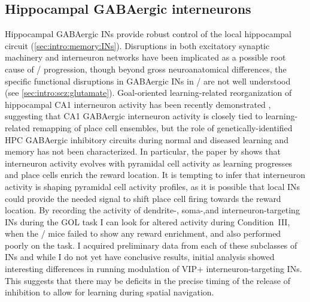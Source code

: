 \subsection{Hippocampal GABAergic interneurons}
Hippocampal GABAergic \acp{IN} provide robust control of the local hippocampal circuit (\autoref{sec:intro:memory:INs}).
Disruptions in both excitatory synaptic machinery and interneuron networks have been implicated as a possible root cause of \scz/ progression, though beyond gross neuroanatomical differences, the specific functional disruptions in GABAergic \acp{IN} in \scz/ are not well understood (see \autoref{sec:intro:scz:glutamate}).
Goal-oriented learning-related reorganization of hippocampal CA1 interneuron activity has been recently demonstrated \citep{Dupret2013}, suggesting that CA1 GABAergic interneuron activity is closely tied to learning-related remapping of place cell ensembles, but the role of genetically-identified \ac{HPC} GABAergic inhibitory circuits during normal and diseased learning and memory has not been characterized.
In particular, the paper by \citeauthor{Dupret2013} shows that interneuron activity evolves with pyramidal cell activity as learning progresses and place cells enrich the reward location.
It is tempting to infer that interneuron activity is shaping pyramidal cell activity profiles, as it is possible that local \acp{IN} could provide the needed signal to shift place cell firing towards the reward location.
By recording the activity of dendrite-, soma-,and interneuron-targeting \acp{IN} during the \ac{GOL} task I can look for altered activity during Condition~III, when the \df/ mice failed to show any reward enrichment, and also performed poorly on the task.
I acquired preliminary data from each of these subclasses of \acp{IN} and while I do not yet have conclusive results, initial analysis showed interesting differences in running modulation of VIP+ interneuron-targeting \acp{IN}. This suggests that there may be deficits in the precise timing of the release of inhibition to allow for learning during spatial navigation.

